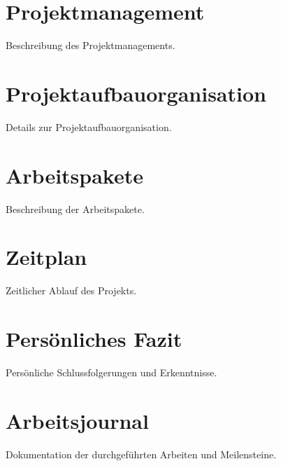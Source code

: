 \chapter{Projektmanagement}
Beschreibung des Projektmanagements.

\chapter{Projektaufbauorganisation}
Details zur Projektaufbauorganisation.

\chapter{Arbeitspakete}
Beschreibung der Arbeitspakete.

\chapter{Zeitplan}
Zeitlicher Ablauf des Projekts.

\chapter{Persönliches Fazit}
Persönliche Schlussfolgerungen und Erkenntnisse.

\chapter{Arbeitsjournal}
Dokumentation der durchgeführten Arbeiten und Meilensteine.

